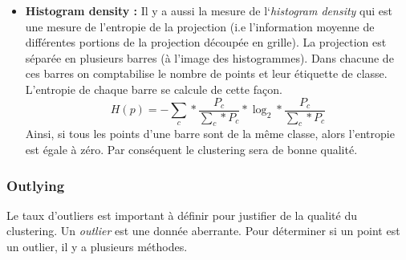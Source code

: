 \begin{itemize}
\item
\textbf{Histogram density : }
\smallskip
Il y a aussi la mesure de l`\textit{histogram density} \cite{HeulotThese} \cite{AndradaTatu2009combining} qui est une mesure de l’entropie de la projection
(i.e l'information moyenne de différentes portions de la projection découpée en grille). La
projection est séparée en plusieurs barres (à l'image des histogrammes). Dans chacune de
ces barres on comptabilise le nombre de points et leur étiquette de classe. L’entropie de
chaque barre se calcule de cette façon. \[ H(p) = - \sum_{c} * \frac{P_c}{\sum_{c}*P_c} * \log_2 * \frac{P_c}{\sum_c * P_c} \]
Ainsi, si tous les points d’une barre sont de la même classe, alors l’entropie est égale à zéro. Par conséquent le clustering sera de bonne qualité.

\end{itemize}
\smallskip



\subsubsection{Outlying}

Le taux d’outliers est important à définir pour justifier de la qualité du clustering.
Un \textit{outlier} est une donnée aberrante. Pour déterminer si un point est un outlier, il y a plusieurs méthodes.

